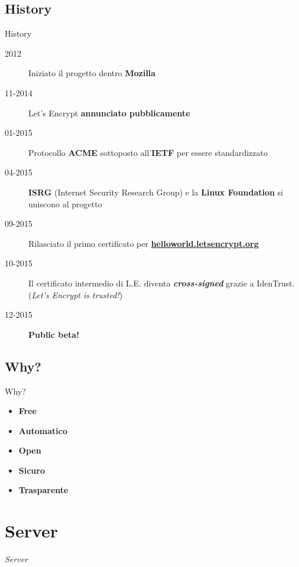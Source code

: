 \documentclass[xcolor=svgnames,11pt]{beamer}
\begin{document}
\subsection{History}
\begin{frame}{History}
\begin{description}
  \item[2012] Iniziato il progetto dentro \textbf{Mozilla}
  \pause
  \item[11-2014] Let's Encrypt \textbf{annunciato pubblicamente}
  \pause
  \item[01-2015] Protocollo \textbf{ACME} sottoposto all'\textbf{IETF} per essere standardizzato
  \pause
  \item[04-2015] \textbf{ISRG} (Internet Security Research Group) e la \textbf{Linux Foundation}
  si uniscono al progetto
  \pause
  \item[09-2015] Rilasciato il primo certificato per \textbf{\href{https://helloworld.letsencrypt.org/}{helloworld.letsencrypt.org}}
  \pause
  \item[10-2015] Il certificato intermedio di L.E. diventa \textbf{\emph{cross-signed}} grazie a IdenTrust.
  (\emph{Let's Encrypt is trusted!})
  \pause
  \item[12-2015] \textbf{Public beta!}
\end{description}
\end{frame}

\subsection{Why?}
\begin{frame}{Why?}
\begin{itemize}
  \item \textbf{Free}
  \medskip\pause
  \item \textbf{Automatico}
  \medskip\pause
  \item \textbf{Open}
  \medskip\pause
  \item \textbf{Sicuro}
  \medskip\pause
  \item \textbf{Trasparente}
\end{itemize}
\end{frame}

\section{Server}
\begin{frame}{}
\begin{center}
\begin{Huge}
\textcolor{leorange}{\emph{Server}}
\end{Huge}
\end{center}
\end{frame}
\end{document}

